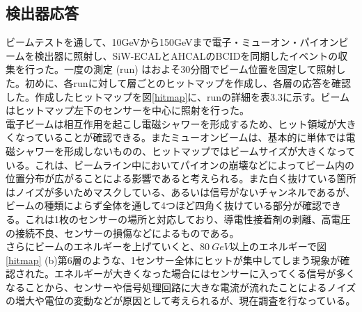 \subsection{検出器応答}
ビームテストを通して、10GeVから150GeVまで電子・ミューオン・パイオンビームを検出器に照射し、SiW-ECALとAHCALのBCIDを同期したイベントの収集を行った。一度の測定 (run) はおよそ30分間でビーム位置を固定して照射した。初めに、各runに対して層ごとのヒットマップを作成し、各層の応答を確認した。作成したヒットマップを図\ref{hitmap}に、runの詳細を表3.3に示す。ビームはヒットマップ左下のセンサーを中心に照射を行った。\\
電子ビームは相互作用を起こし電磁シャワーを形成するため、ヒット領域が大きくなっていることが確認できる。またミューオンビームは、基本的に単体では電磁シャワーを形成しないものの、ヒットマップではビームサイズが大きくなっている。これは、ビームライン中においてパイオンの崩壊などによってビーム内の位置分布が広がることによる影響であると考えられる。また白く抜けている箇所はノイズが多いためマスクしている、あるいは信号がないチャンネルであるが、ビームの種類によらず全体を通して4つほど四角く抜けている部分が確認できる。これは1枚のセンサーの場所と対応しており、導電性接着剤の剥離、高電圧の接続不良、センサーの損傷などによるものである。\\
さらにビームのエネルギーを上げていくと、$\SI{80}{GeV}$以上のエネルギーで図\ref{hitmap} (b)第6層のような、1センサー全体にヒットが集中してしまう現象が確認された。エネルギーが大きくなった場合にはセンサーに入ってくる信号が多くなることから、センサーや信号処理回路に大きな電流が流れたことによるノイズの増大や電位の変動などが原因として考えられるが、現在調査を行なっている。
